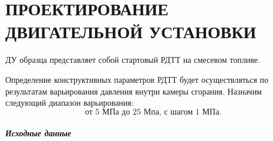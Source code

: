 \chapter{ПРОЕКТИРОВАНИЕ \\ДВИГАТЕЛЬНОЙ УСТАНОВКИ}
ДУ образца представляет собой стартовый РДТТ на смесевом топливе.

Определение конструктивных параметров РДТТ будет осуществляться по результатам варьирования давления внутри камеры сгорания. Назначим следующий диапазон варьирования:
\[ \text{от 5 МПа до 25 Мпа, с шагом 1 МПа.}
\]

\paragraph{Исходные данные}




